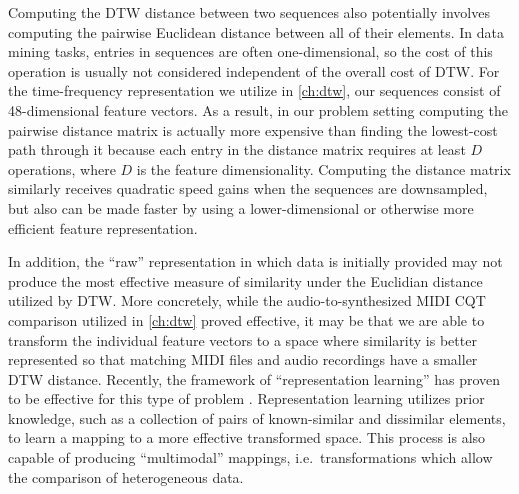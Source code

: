 Computing the DTW distance between two sequences also potentially involves computing the pairwise Euclidean distance between all of their elements.
In data mining tasks, entries in sequences are often one-dimensional, so the cost of this operation is usually not considered independent of the overall cost of DTW.
For the time-frequency representation we utilize in \cref{ch:dtw}, our sequences consist of 48-dimensional feature vectors.
As a result, in our problem setting computing the pairwise distance matrix is actually more expensive than finding the lowest-cost path through it because each entry in the distance matrix requires at least $D$ operations, where $D$ is the feature dimensionality.
Computing the distance matrix similarly receives quadratic speed gains when the sequences are downsampled, but also can be made faster by using a lower-dimensional or otherwise more efficient feature representation.

In addition, the ``raw'' representation in which data is initially provided may not produce the most effective measure of similarity under the Euclidian distance utilized by DTW.
More concretely, while the audio-to-synthesized MIDI CQT comparison utilized in \cref{ch:dtw} proved effective, it may be that we are able to transform the individual feature vectors to a space where similarity is better represented so that matching MIDI files and audio recordings have a smaller DTW distance.
Recently, the framework of ``representation learning'' has proven to be effective for this type of problem \cite{bengio2013representation}.
Representation learning utilizes prior knowledge, such as a collection of pairs of known-similar and dissimilar elements, to learn a mapping to a more effective transformed space.
This process is also capable of producing ``multimodal'' mappings, i.e.\ transformations which allow the comparison of heterogeneous data.

